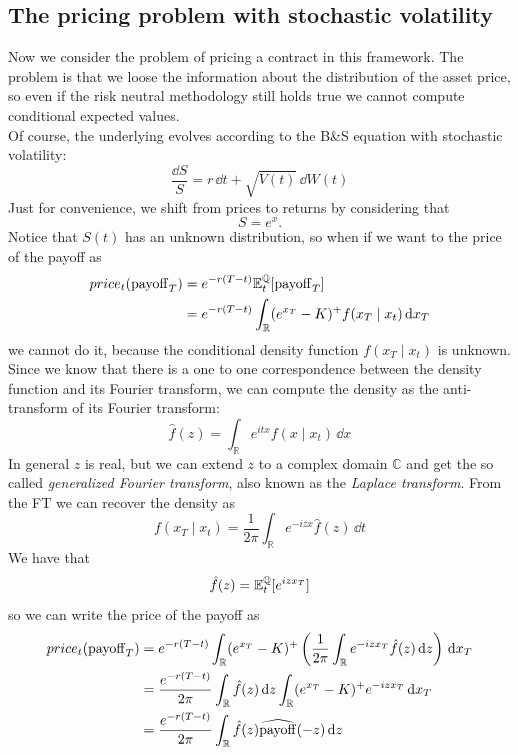 \subsection{The pricing problem with stochastic volatility}
Now we consider the problem of pricing a contract in this framework. The problem is that we loose the information about the distribution of the asset price, so even if the risk neutral methodology still holds true we cannot compute conditional expected values.\\
Of course, the underlying evolves according to the B\&S equation with stochastic volatility:
\begin{equation}
    \frac{\dd S}{S} = r\,\dd t + \sqrt{V(t)}\,\dd W(t)
\end{equation}
Just for convenience, we shift from prices to returns by considering that
\begin{equation*}
    S = e^x.
\end{equation*}
Notice that $S(t)$ has an unknown distribution, so when if we want to the price of the payoff as
\begin{align*}
    price_t(\operatorname{payoff}_T) &= e^{-r(T-t)}\mathbb{E}^{\mathbb{Q}}_t[\operatorname{payoff}_T] \\
    &=
    e^{-r(T-t)}\int_{\mathbb{R}}(e^{x_T}-K)^+ f(x_T \mid x_t)\,\dd x_T
\end{align*}
we cannot do it, because the conditional density function $f(x_T\mid x_t)$ is unknown. Since we know that there is a one to one correspondence between the density function and its Fourier transform, we can compute the density as the anti-transform of its Fourier transform:
\begin{equation*}
    \hat{f}(z) = \int_{\mathbb{R}}e^{itx}f(x\mid x_t)\,\dd x
\end{equation*}
In general $z$ is real, but we can extend $z$ to a complex domain $\mathbb{C}$ and get the so called \emph{generalized Fourier transform}, also known as the \emph{Laplace transform}. From the FT we can recover the density as
\begin{equation*}
    f(x_T\mid x_t) = \frac{1}{2\pi}\int_{\mathbb{R}}e^{-izx}\hat{f}(z)\,\dd t
\end{equation*}
We have that
\begin{equation*}
    \hat{f}(z) = \mathbb{E}^{\mathbb{Q}}_t[e^{izx_T}]
\end{equation*}
so we can write the price of the payoff as
\begin{align*}
    price_t(\operatorname{payoff}_T) &= e^{-r(T-t)}\int_{\mathbb{R}}(e^{x_T}-K)^+ \left(\frac{1}{2\pi}\int_{\mathbb{R}}e^{-izx_T}\hat{f}(z)\,\dd z\right)\,\dd x_T \\
    &=
    \frac{e^{-r(T-t)}}{2\pi}\int_{\mathbb{R}}\hat{f}(z)\,\dd z \int_{\mathbb{R}}(e^{x_T}-K)^+e^{-izx_T}\,\dd x_T \\
    &=
    \frac{e^{-r(T-t)}}{2\pi}\int_{\mathbb{R}}\hat{f}(z)\widehat{\operatorname{payoff}}(-z)\,\dd z
\end{align*}
